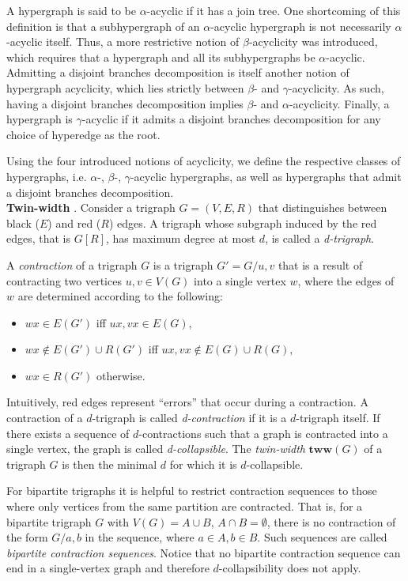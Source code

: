 \documentclass{article}
\begin{document}
A hypergraph is said to be $\alpha$-acyclic if it has a join tree.
One shortcoming of this definition is that a subhypergraph of an $\alpha$-acyclic hypergraph is not necessarily $\alpha$-acyclic itself.
Thus, a more restrictive notion of $\beta$-acyclicity was introduced, which requires that a hypergraph and all its subhypergraphs be $\alpha$-acyclic.
Admitting a disjoint branches decomposition is itself another notion of hypergraph acyclicity, which lies strictly between $\beta$- and $\gamma$-acyclicity.
As such, having a disjoint branches decomposition implies $\beta$- and $\alpha$-acyclicity.
Finally, a hypergraph is $\gamma$-acyclic if it admits a disjoint branches decomposition for any choice of hyperedge as the root.

Using the four introduced notions of acyclicity, we define the respective classes of hypergraphs, i.e. $\alpha$-, $\beta$-, $\gamma$-acyclic hypergraphs, as well as hypergraphs that admit a disjoint branches decomposition. \\

\noindent
\textbf{Twin-width} \cite{DBLP:conf/sat/GanianPSSS22}.
Consider a trigraph $G=(V,E,R)$ that distinguishes between black ($E$) and red ($R$) edges.
A trigraph whose subgraph induced by the red edges, that is $G[R]$, has maximum degree at most $d$, is called a {\em d-trigraph}.

A {\em contraction} of a trigraph $G$ is a trigraph $G'=G/u,v$ that is a result of contracting two vertices $u,v \in V(G)$ into a single vertex $w$, where the edges of $w$ are determined according to the following:
\begin{itemize}
	\item $wx \in E(G')$ iff $ux, vx \in E(G)$,
	\item $wx \not\in E(G') \cup R(G')$ iff $ux, vx \not\in E(G)\cup R(G),$
	\item $wx \in R(G')$ otherwise.
\end{itemize}
Intuitively, red edges represent ``errors'' that occur during a contraction.
A contraction of a $d$-trigraph is called {\em d-contraction} if it is a $d$-trigraph itself.
If there exists a sequence of $d$-contractions such that a graph is contracted into a single vertex, the graph is called {\em d-collapsible}.
The {\em twin-width} $\textbf{tww}(G)$ of a trigraph $G$ is then the minimal $d$ for which it is $d$-collapsible.

For bipartite trigraphs it is helpful to restrict contraction sequences to those where only vertices from the same partition are contracted.
That is, for a bipartite trigraph $G$ with $V(G) = A \cup B$, $A \cap B = \emptyset$, there is no contraction of the form $G/a,b$ in the sequence, where $a\in A, b\in B$.
Such sequences are called {\em bipartite contraction sequences}.
Notice that no bipartite contraction sequence can end in a single-vertex graph and therefore $d$-collapsibility does not apply.
\end{document}

